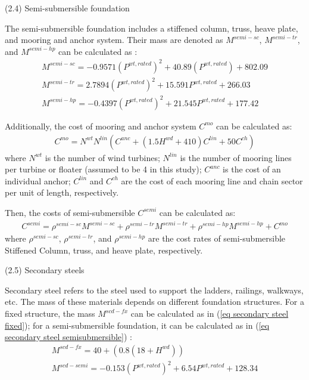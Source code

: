 \documentclass[sn-mathphys,Numbered]{sn-jnl}%
\theoremstyle{thmstyleone}%
\theoremstyle{thmstyletwo}%
\theoremstyle{thmstylethree}%
\begin{document}
(2.4) Semi-submersible foundation

The semi-submersible foundation includes a stiffened column, truss, heave plate, and mooring and anchor system. Their mass are denoted as $M^{semi-sc}$, $M^{semi-tr}$, and $ M^{semi-hp}$ can be calculated as \cite{NRELOffshoreBalance,gonzalez2024techno}:
\begin{align}
    M^{semi-sc} = -0.9571(P^{wt,rated})^2 + 40.89(P^{wt,rated}) + 802.09
\\
    M^{semi-tr} = 2.7894 (P^{wt,rated})^2 + 15.591 P^{wt,rated} + 266.03
\\
    M^{semi-hp} = - 0.4397 (P^{wt,rated})^2 + 21.545 P^{wt,rated} + 177.42
\end{align}

Additionally, the cost of mooring and anchor system $C^{mo}$ can be calculated as:
\begin{align}
    C^{mo} = N^{wt} N^{lin} (C^{anc} + (1.5 H^{wd} + 410) C^{lin} + 50 C^{ch})
\end{align}
where $N^{wt}$ is the number of wind turbines; $N^{lin}$ is the number of mooring lines per turbine or floater (assumed to be 4 in this study); $C^{anc}$ is the cost of an individual anchor; $C^{lin}$ and $C^{ch}$ are the cost of each mooring line and chain sector per unit of length, respectively.

Then, the costs of semi-submersible $C^{semi}$ can be calculated as:
\begin{gather}
    C^{semi} = \rho^{semi-sc} M^{semi-sc} + \rho^{semi-tr} M^{semi-tr} + \rho^{semi-hp} M^{semi-hp} + C^{mo}
\end{gather}
where $\rho^{semi-sc}$, $\rho^{semi-tr}$, and $\rho^{semi-hp}$ are the cost rates of semi-submersible Stiffened Column, truss, and heave plate, respectively.

(2.5) Secondary steels

Secondary steel refers to the steel used to support the ladders, railings, walkways, etc. The mass of these materials depends on different foundation structures. For a fixed structure, the mass $M^{scd-fx}$ can be calculated as in (\ref{eq secondary steel fixed}); for a semi-submersible foundation, it can be calculated as in (\ref{eq secondary steel semisubmersible}) \cite{NRELOffshoreBalance}:
\begin{gather}
    M^{scd-fx} = 40 + \left(0.8\left(18+H^{wd}\right)\right)
\label{eq secondary steel fixed} \\
    M^{scd-semi} = -0.153(P^{wt,rated})^2 + 6.54 P^{wt,rated} + 128.34
\label{eq secondary steel semisubmersible}
\end{gather}
\end{document}
